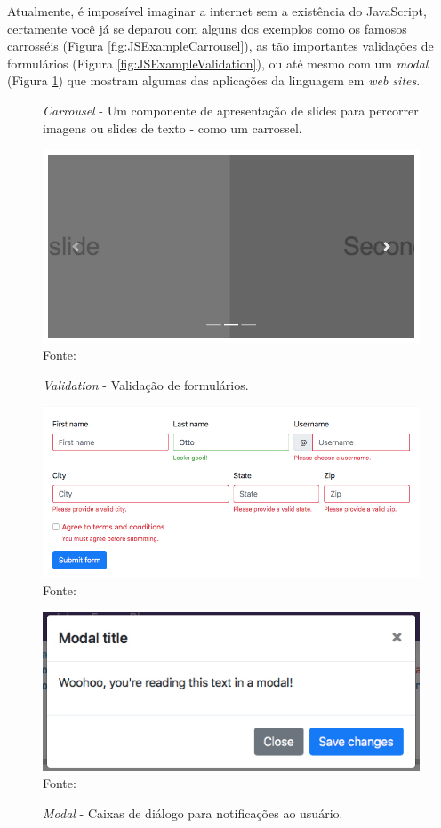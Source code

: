 \documentclass[
	12pt,				%
	openright,			%
	twoside,			%
	a4paper,			%
	english,			%
	brazil				%
	]{abntex2}
\begin{document}
Atualmente, é impossível imaginar a internet sem a existência do JavaScript, certamente você já se deparou com alguns dos exemplos como os famosos carrosséis (Figura \ref{fig:JSExampleCarrousel}), as tão importantes validações de formulários (Figura \ref{fig:JSExampleValidation}), ou até mesmo com um \textit{modal} (Figura \ref{fig:JSExampleModal}) que mostram algumas das aplicações da linguagem em \textit{web sites}.

\begin{figure}[h]
	\centering

	\caption{\textit{Carrousel} - Um componente de apresentação de slides para percorrer imagens ou slides de texto - como um carrossel.} \label{fig:JSExampleCarrousel}
    \includegraphics[scale=0.35]{js-example-carousel} \\
    Fonte: {\citeauthor{bootstrap_docs}}

    \caption{\textit{Validation} - Validação de formulários.} \label{fig:JSExampleValidation}
    \includegraphics[scale=0.4]{js-example-validation} \\
    Fonte: {\citeauthor{bootstrap_docs}}
	
    \caption{\textit{Modal} - Caixas de diálogo para notificações ao usuário.} \label{fig:JSExampleModal}
    \includegraphics[scale=0.45]{js-example-modal} \\
    Fonte: {\citeauthor{bootstrap_docs}}

\end{figure}
\end{document}
